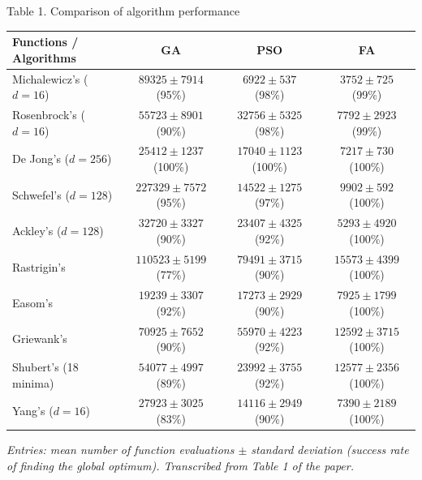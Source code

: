 \documentclass[aspectratio=169,11pt]{beamer}
\begin{document}
\begin{frame}[t]{Table 1. Comparison of algorithm performance}
\centering\small\setlength{\tabcolsep}{3pt}
\begin{tabular}{lccc}
\toprule
\textbf{Functions / Algorithms} & \textbf{GA} & \textbf{PSO} & \textbf{FA}\\\midrule
Michalewicz's ($d=16$) & $89325\pm7914$ (95\%) & $6922\pm537$ (98\%) & $3752\pm725$ (99\%)\\
Rosenbrock's ($d=16$) & $55723\pm8901$ (90\%) & $32756\pm5325$ (98\%) & $7792\pm2923$ (99\%)\\
De Jong's ($d=256$) & $25412\pm1237$ (100\%) & $17040\pm1123$ (100\%) & $7217\pm730$ (100\%)\\
Schwefel's ($d=128$) & $227329\pm7572$ (95\%) & $14522\pm1275$ (97\%) & $9902\pm592$ (100\%)\\
Ackley's ($d=128$) & $32720\pm3327$ (90\%) & $23407\pm4325$ (92\%) & $5293\pm4920$ (100\%)\\
Rastrigin's & $110523\pm5199$ (77\%) & $79491\pm3715$ (90\%) & $15573\pm4399$ (100\%)\\
Easom's & $19239\pm3307$ (92\%) & $17273\pm2929$ (90\%) & $7925\pm1799$ (100\%)\\
Griewank's & $70925\pm7652$ (90\%) & $55970\pm4223$ (92\%) & $12592\pm3715$ (100\%)\\
Shubert's (18 minima) & $54077\pm4997$ (89\%) & $23992\pm3755$ (92\%) & $12577\pm2356$ (100\%)\\
Yang's ($d=16$) & $27923\pm3025$ (83\%) & $14116\pm2949$ (90\%) & $7390\pm2189$ (100\%)\\
\bottomrule
\end{tabular}\par\vspace{0.2em}
{\footnotesize\itshape Entries: mean number of function evaluations $\pm$ standard deviation (success rate of finding the global optimum). Transcribed from Table 1 of the paper.\par}
\end{frame}
\end{document}
